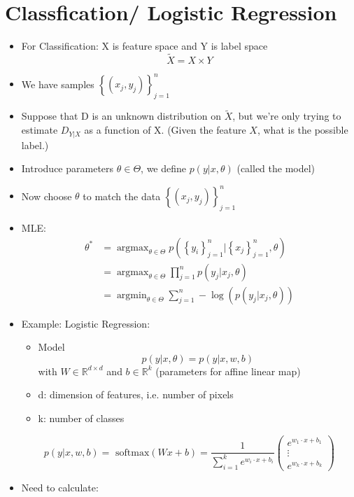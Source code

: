 \section{Classfication/ Logistic Regression}
\begin{itemize}
	\item For Classification: X is feature space and Y is label space
	$$
	\widetilde{X}=X \times Y
	$$
	\item We have samples $\left\{\left(x_{j}, y_{j}\right)\right\}_{j=1}^{n}$
	\item Suppose that D is an unknown distribution on $\widetilde{X}$, but we're only trying to estimate $D_{Y|X}$ as a function of X. (Given the feature $X$, what is the possible label.)
	\item Introduce parameters $\theta\in \Theta$, we define $p(y|x, \theta)$ (called the model)
	\item Now choose $\theta$ to match the data $\left\{\left(x_{j}, y_{j}\right)\right\}_{j=1}^{n}$
	\item MLE: 
	\begin{align*}
	\theta^{*}&=\operatorname{argmax}_{\theta \in\Theta} p\left(\left\{y_{i}\right\}_{j=1}^{n} |\left\{x_{j}\right\}_{j=1}^{n}, \theta\right)\\
	&=\operatorname{argmax}_{\theta \in\Theta}  \prod_{j=1}^{n} p\left(y_{j} | x_{j}, \theta\right)   \\
	&=\operatorname{argmin}_{\theta \in\Theta}  \sum_{j=1}^{n}-\log \left(p\left(y_{j} | x_{j}, \theta\right)\right)
	\end{align*}
	\item Example: Logistic Regression:
	\begin{itemize}
		\item Model 
		$$
		p(y | x, \theta)=p(y | x, w, b)
		$$
		with $W\in \mathbb{R}^{d\times d}$ and $b\in \mathbb{R}^k$ (parameters for affine linear map)
		\item d: dimension of features, i.e. number of pixels
		\item k: number of classes
	\end{itemize}
$$
p(y | x, w, b)=\mbox{ softmax} \left( W x+b\right)=\frac{1}{\sum_{i=1}^{k} e^{w_{i}\cdot x+b_{i}}}\left(\begin{array}{c}e^{w_{1}\cdot x +b_{1}}  \\ \vdots \\ e^{w_{k} \cdot x +b_{k}}\end{array}\right)
$$
\item Need to calculate:
\begin{equation}\label{eq:pp}

\end{equation}
\end{itemize}

